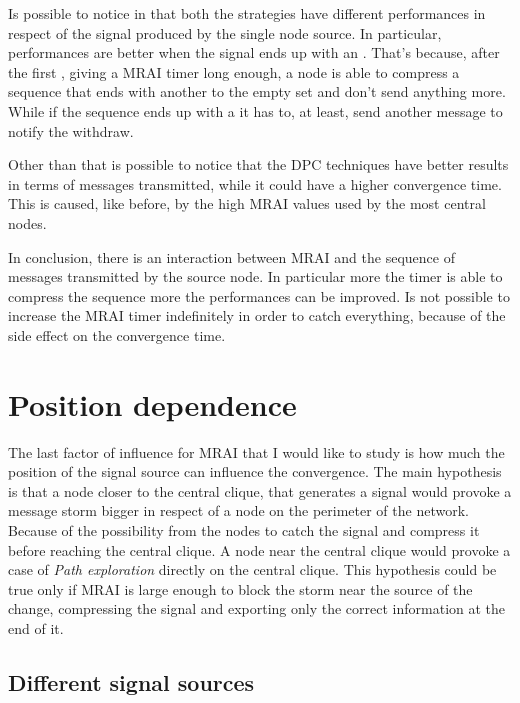Is possible to notice in  that
both the strategies have different performances in respect of the signal
produced by the single node source.
In particular, performances are better when the signal ends up with an .
That's because, after the first , giving a \ac{MRAI} timer long enough,
a node is able to compress a sequence that ends with another  to the
empty set and don't send anything more.
While if the sequence ends up with a  it has to, at least, send another
message to notify the withdraw.

Other than that is possible to notice that the \ac{DPC} techniques have better
results in terms of messages transmitted, while it could have a higher
convergence time.
This is caused, like before, by the high \ac{MRAI} values used by the most
central nodes.

In conclusion, there is an interaction between \ac{MRAI} and the sequence of messages
transmitted by the source node.
In particular more the timer is able to compress the sequence more the performances
can be improved.
Is not possible to increase the \ac{MRAI} timer indefinitely in order to catch
everything, because of the side effect on the convergence time.

\section{Position dependence}
\label{sec:position_dependance}

The last factor of influence for \ac{MRAI} that I would like to study is how much
the position of the signal source can influence the convergence.
The main hypothesis is that a node closer to the central clique, that generates
a signal would provoke a message storm bigger in respect of a node on the perimeter
of the network.
Because of the possibility from the nodes to catch the signal and compress it
before reaching the central clique.
A node near the central clique would provoke a case of \textit{Path exploration}
directly on the central clique.
This hypothesis could be true only if \ac{MRAI} is large enough to block the
storm near the source of the change, compressing the signal and exporting only
the correct information at the end of it.

\subsection{Different signal sources}
\label{subsec:different_destinations}

